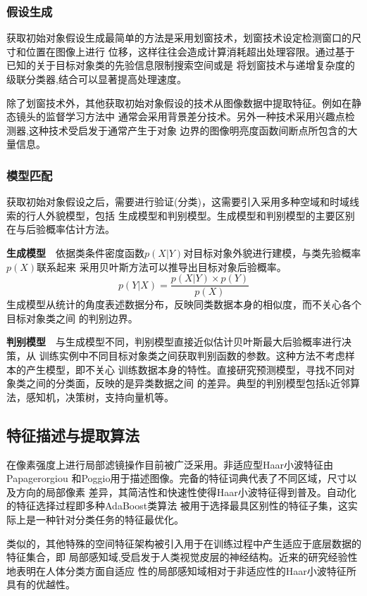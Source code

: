 \subsubsection{假设生成}
获取初始对象假设生成最简单的方法是采用划窗技术，划窗技术设定检测窗口的尺寸和位置在图像上进行
位移，这样往往会造成计算消耗超出处理容限\cite{DT2005}。通过基于已知的关于目标对象类的先验信息限制搜索空间或是
将划窗技术与递增复杂度的级联分类器\cite{boostedHOG},\cite{haar}结合可以显著提高处理速度。

除了划窗技术外，其他获取初始对象假设的技术从图像数据中提取特征。例如在静态镜头的监督学习方法中
通常会采用背景差分技术。另外一种技术采用兴趣点检测器\cite{stip},这种技术受启发于通常产生于对象
边界的图像明亮度函数间断点所包含的大量信息。
\subsubsection{模型匹配}
获取初始对象假设之后，需要进行验证(分类)，这需要引入采用多种空域和时域线索的行人外貌模型，包括
生成模型和判别模型\cite{classificationmethods}。生成模型和判别模型的主要区别在与后验概率估计方法。

\textbf{生成模型}~~依据类条件密度函数$p(X|Y)$对目标对象外貌进行建模，与类先验概率$p(X)$联系起来
采用贝叶斯方法可以推导出目标对象后验概率。
\begin{equation}
    p(Y|X)=\frac{p(X|Y)\times{}p(Y)}{p(X)}
\end{equation}
生成模型从统计的角度表述数据分布，反映同类数据本身的相似度，而不关心各个目标对象类之间
的判别边界。

\textbf{判别模型}~~与生成模型不同，判别模型直接近似估计贝叶斯最大后验概率进行决策，从
训练实例中不同目标对象类之间获取判别函数的参数。这种方法不考虑样本的产生模型，即不关心
训练数据本身的特性。直接研究预测模型，寻找不同对象类之间的分类面，反映的是异类数据之间
的差异。典型的判别模型包括k近邻算法，感知机，决策树，支持向量机等。
\subsection{特征描述与提取算法}
在像素强度上进行局部滤镜操作目前被广泛采用。非适应型Haar小波特征由Papagerorgiou
和Poggio用于描述图像。完备的特征词典代表了不同区域，尺寸以及方向的局部像素
差异，其简洁性和快速性使得Haar小波特征得到普及。自动化的特征选择过程即多种AdaBoost类算法
被用于选择最具区别性的特征子集\cite{haar}，这实际上是一种针对分类任务的特征最优化。

类似的，其他特殊的空间特征架构被引入用于在训练过程中产生适应于底层数据的特征集合，即
局部感知域\cite{nnlrf},受启发于人类视觉皮层的神经结构。近来的研究经验性地表明在人体分类方面自适应
性的局部感知域相对于非适应性的Haar小波特征所具有的优越性。

